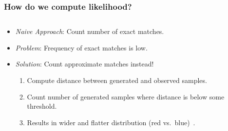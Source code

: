 \documentclass[11pt]{beamer}
\begin{document}
    \begin{frame}
        \frametitle{How do we compute likelihood?}
        \begin{columns}
            \begin{column}{0.6\textwidth}
                \begin{itemize}
                    \item \emph{Naive Approach}: Count number of exact matches. \medskip
                    \item \emph{Problem}: Frequency of exact matches is low. \medskip
                    \item \emph{Solution}: Count approximate matches instead!
                        \begin{enumerate}
                            \item Compute distance between generated and observed samples.
                            \item Count number of generated samples where distance is below some threshold.
                            \item Results in wider and flatter
                                distribution (red vs.\ blue)~\cite{lintusaariFundamentalsRecentDevelopments2017}.
                        \end{enumerate}
                \end{itemize}
            \end{column}
            \begin{column}{0.4\textwidth}
                \begin{flushleft}
                    
                \end{flushleft}
            \end{column}
        \end{columns}


\end{frame}
\end{document}
